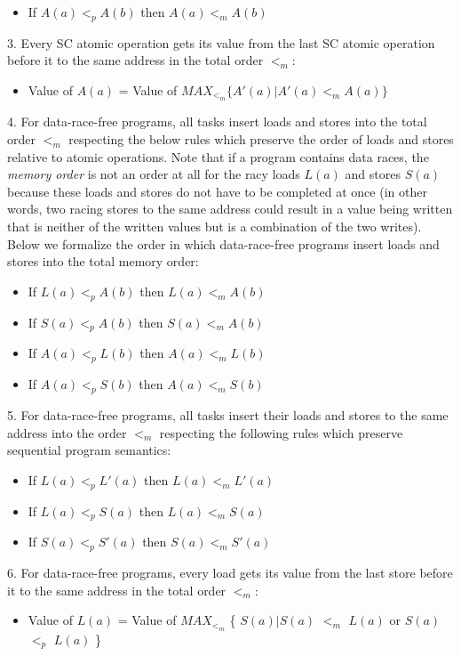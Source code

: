 \begin{itemize}
  \item If $A(a)<_pA(b)$ then $A(a)<_mA(b)$
\end{itemize}

3. Every SC atomic operation gets its value from the last SC atomic operation before it to the same address in the total order $<_m$:
\begin{itemize}
  \item Value of $A(a)$ = Value of $MAX_{<_m} \{A'(a)|A'(a) <_m A(a) \}$
\end{itemize}

\label{SC_for_DRF_atomic_order}
4. For data-race-free programs, all tasks insert loads and stores into the
total order $<_m$ respecting the below rules which preserve the order of loads
and stores relative to atomic operations.  Note that if a program contains data
races, the \textit{memory order} is not an order at all for the racy loads
$L(a)$ and stores $S(a)$ because these loads and stores do not have to be
completed at once (in other words, two racing stores to the same address could
result in a value being written that is neither of the written values but is a
combination of the two writes). Below we formalize the order in which data-race-free programs insert loads and stores into the total memory order:
\begin{itemize}
  \item If $L(a)<_pA(b)$ then $L(a)<_mA(b)$
  \item If $S(a)<_pA(b)$ then $S(a)<_mA(b)$
  \item If $A(a)<_pL(b)$ then $A(a)<_mL(b)$
  \item If $A(a)<_pS(b)$ then $A(a)<_mS(b)$
\end{itemize}

5. For data-race-free programs, all tasks insert their loads and stores to the
same address into the order $<_m$ respecting the following rules which preserve
sequential program semantics:

\begin{itemize}
  \item If $L(a) <_p L'(a)$ then $L(a) <_m L'(a)$
  \item If $L(a) <_p S(a)$ then $L(a) <_m S(a)$
  \item If $S(a) <_p S'(a)$ then $S(a) <_m S'(a)$
\end{itemize}

6. For data-race-free programs, every load gets its value from the last store before it to the same address in the total order $<_m$:
\begin{itemize}
  \item Value of $L(a)$ = Value of $MAX_{<_m}$ \{ $S(a)|S(a)$ $<_m$ $L(a)$ or $S(a)$ $<_p$ $L(a)$ \}
\end{itemize}

